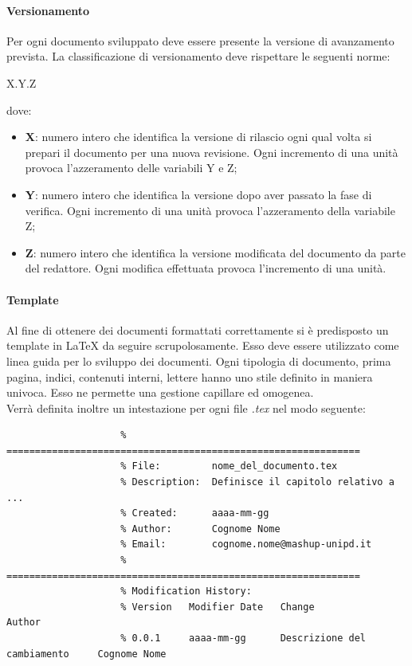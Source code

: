 			\paragraph{Versionamento}
			Per ogni documento sviluppato deve essere presente la versione di avanzamento prevista. La classificazione di versionamento deve rispettare le seguenti norme:
			\begin{center}
				X.Y.Z
			\end{center}
			dove:
			\begin{itemize}
				\item \textbf{X}: numero intero che identifica la versione di rilascio ogni qual volta si prepari il documento per una nuova revisione. Ogni incremento di una unità provoca l'azzeramento delle variabili Y e Z;
				\item \textbf{Y}: numero intero che identifica la versione dopo aver passato la fase di verifica. Ogni incremento di una unità provoca l'azzeramento della variabile Z;
				\item \textbf{Z}: numero intero che identifica la versione modificata del documento da parte del redattore. Ogni modifica effettuata provoca l'incremento di una unità.
			\end{itemize}


			\paragraph{Template}
			Al fine di ottenere dei documenti formattati correttamente si è predisposto un template in \LaTeX{} da seguire scrupolosamente. Esso deve essere utilizzato come linea guida per lo sviluppo dei documenti. Ogni tipologia di documento, prima pagina, indici, contenuti interni, lettere hanno uno stile definito in maniera univoca. Esso ne permette una gestione capillare ed omogenea.\\
			Verrà definita inoltre un intestazione per ogni file \emph{.tex} nel modo seguente:
				\begin{verbatim}
					% ==============================================================
					% File:			nome_del_documento.tex
					% Description:	Definisce il capitolo relativo a ...
					% Created:		aaaa-mm-gg
					% Author:		Cognome Nome
					% Email:		cognome.nome@mashup-unipd.it
					% ==============================================================
					% Modification History:
					% Version	Modifier Date	Change							Author
					% 0.0.1 	aaaa-mm-gg 		Descrizione del cambiamento		Cognome Nome
					
				\end{verbatim}
			\noindent

